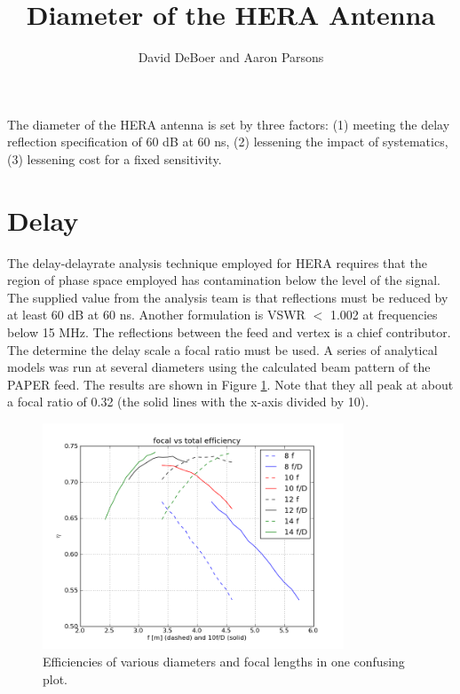 \documentclass[11pt]{article}
\begin{document}
\title{Diameter of the HERA Antenna}
\author{David DeBoer and Aaron Parsons}
\maketitle

The diameter of the HERA antenna is set by three factors:  (1) meeting the delay reflection specification of 60 dB at 60 ns, (2) lessening the impact of systematics, (3) lessening cost for a fixed sensitivity.

\section{Delay}
The delay-delayrate analysis technique employed for HERA requires that the region of phase space employed has contamination below the level of the signal.  The supplied value from the analysis team is that reflections must be reduced by at least 60 dB at 60 ns.  Another formulation is VSWR $<$ 1.002 at frequencies below 15 MHz.  The reflections between the feed and vertex is a chief contributor.  The determine the delay scale a focal ratio must be used.  A series of analytical models was run at several diameters using the calculated beam pattern of the PAPER feed.  The results are shown in Figure \ref{fig:efficiency}.  Note that they all peak at about a focal ratio of 0.32 (the solid lines with the x-axis divided by 10).

\begin{figure}[h]
\centering
\includegraphics[width=0.8\textwidth]{heraDishfDplot.png}
\caption{Efficiencies of various diameters and focal lengths in one confusing plot.}
\label{fig:efficiency}
\end{figure}
\end{document}
